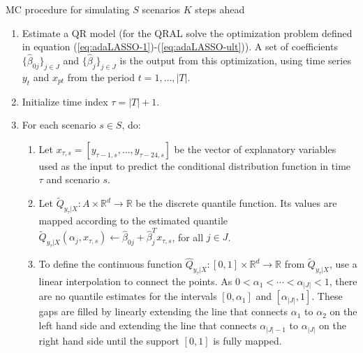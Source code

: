 \begin{algorithm}

\caption{MC procedure for simulating $S$ scenarios $K$ steps ahead}
\label{alg:mc-procedure}

\begin{enumerate}
	
	\item Estimate a QR model (for the QRAL solve the optimization problem defined in equation (\ref{eq:adaLASSO-1})-(\ref{eq:adaLASSO-ult})). 
	A set of coefficients $\{ \hat\beta_{0j} \}_{j \in J}$ and $\{ \hat\beta_{j} \}_{j \in J}$ is the output from this optimization, using time series $y_t$ and $x_{pt}$ from the period $t = 1, \dots, |T|$. 

	\item Initialize time index $\tau = |T| + 1$.
	
	\item For each scenario $s \in S$, do:
		\begin{enumerate}

		\item Let $x_{\tau,s} = [y_{\tau-1,s}, \dots, y_{\tau-24,s}]$ be the vector of explanatory variables used as the input to predict the conditional distribution function in time $\tau$ and scenario $s$.

		\item Let $\tilde{Q}_{y_{\tau}|X}:A \times \mathbb{R}^d \rightarrow \mathbb{R}$ be the discrete quantile function. Its values are mapped according to the estimated quantile $\tilde Q_{y_{\tau}|X}(\alpha_j, x_{\tau,s}) \leftarrow \hat\beta_{0j} + \hat\beta_j^T x_{\tau,s}$, for all $j \in J$.
		
		\item To define the continuous function $\hat{Q}_{y_{\tau}|X}:[0,1] \times \mathbb{R}^d \rightarrow \mathbb{R}$ from $\tilde Q_{y_{\tau}|X}$, use a linear interpolation to connect the points. As $0 < \alpha_1 < \cdots < \alpha_{|J|} < 1$, there are no quantile estimates for the intervals $[0,\alpha_1]$ and $[\alpha_{|J|},1]$. These gaps are filled by linearly extending the line that connects $\alpha_1$ to $\alpha_2$ on the left hand side and extending the line that connects $\alpha_{|J|-1}$ to $\alpha_{|J|}$ on the right hand side until the support $[0,1]$ is fully mapped.  

		

\end{enumerate}
\end{enumerate}
\end{algorithm}
